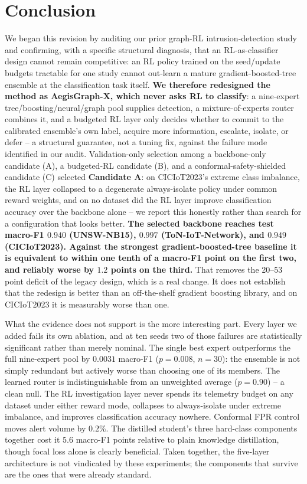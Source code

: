 \documentclass[journal]{IEEEtran}
\begin{document}
\section{Conclusion}
\label{sec:conclusion}

We began this revision by auditing our prior graph-RL intrusion-detection
study and confirming, with a specific structural diagnosis, that an
RL-as-classifier design cannot remain competitive: an RL policy trained on
the seed/update budgets tractable for one study cannot out-learn a mature
gradient-boosted-tree ensemble at the classification task itself.
\textbf{We therefore redesigned the method as AegisGraph-X, which never
asks RL to classify}: a nine-expert tree/boosting/neural/graph pool supplies
detection, a mixture-of-experts router combines it, and a budgeted RL layer
only decides whether to commit to the calibrated ensemble's own label,
acquire more information, escalate, isolate, or defer -- a structural
guarantee, not a tuning fix, against the failure mode identified in our
audit. Validation-only selection among a backbone-only candidate (A), a
budgeted-RL candidate (B), and a conformal-safety-shielded candidate (C)
selected \textbf{Candidate A}: on CICIoT2023's extreme class imbalance, the
RL layer collapsed to a degenerate always-isolate policy under common reward
weights, and on no dataset did the RL layer improve classification accuracy
over the backbone alone -- we report this honestly rather than search for a
configuration that looks better. \textbf{The selected backbone reaches test macro-F1 $0.940$ (UNSW-NB15),
$0.997$ (ToN-IoT-Network), and $0.949$ (CICIoT2023). Against the strongest
gradient-boosted-tree baseline it is equivalent to within one tenth of a
macro-F1 point on the first two, and reliably worse by $1.2$ points on the
third.} That removes the 20--53 point deficit of the legacy design, which is
a real change. It does not establish that the redesign is better than an
off-the-shelf gradient boosting library, and on CICIoT2023 it is measurably
worse than one.

What the evidence does not support is the more interesting part. Every layer
we added fails its own ablation, and at ten seeds two of those failures are
statistically significant rather than merely nominal. The single best expert
outperforms the full nine-expert pool by $0.0031$ macro-F1
($p = 0.008$, $n = 30$): the ensemble is not simply redundant but actively
worse than choosing one of its members. The learned router is
indistinguishable from an unweighted average ($p = 0.90$) -- a clean null.
The RL investigation layer never spends its telemetry budget on any dataset
under either reward mode, collapses to always-isolate under extreme
imbalance, and improves classification accuracy nowhere. Conformal FPR
control moves alert volume by $0.2\%$. The distilled student's three
hard-class components together cost it $5.6$ macro-F1 points relative to
plain knowledge distillation, though focal loss alone is clearly beneficial.
Taken together, the five-layer architecture is not vindicated by these
experiments; the components that survive are the ones that were already
standard.
\end{document}
